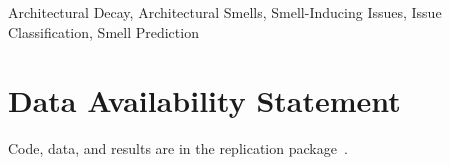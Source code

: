 \documentclass[conference]{IEEEtran}
\begin{document}
\begin{IEEEkeywords}
Architectural Decay, Architectural Smells, Smell-Inducing Issues, Issue Classification, Smell Prediction
\end{IEEEkeywords}
\maketitle










\section*{Data Availability Statement}
Code, data, and results are in the replication package~\cite{replication}.




\end{document}
